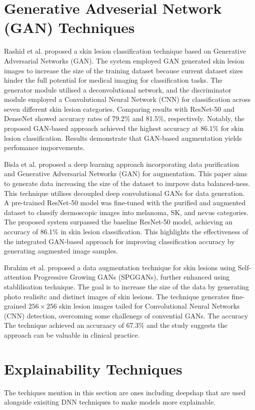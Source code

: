 \section{Generative Adveserial Network (GAN) Techniques}
Rashid et al.\cite{Rashid2019b} proposed a skin lesion classification technique based on Generative Adversarial Networks (GAN). The system employed GAN generated skin lesion images to increase the size of the training dataset because current dataset sizes hinder the full potential for medical imaging for classification tasks. The generator module utilised a deconvolutional network, and the discriminator module employed a Convolutional Neural Network (CNN) for classification across seven different skin lesion categories. Comparing results with ResNet-50 and DenseNet showed accuracy rates of 79.2\% and 81.5\%, respectively. Notably, the proposed GAN-based approach achieved the highest accuracy at 86.1\% for skin lesion classification. Results demonstrate that GAN-based augmentation yields perfomance imporvements.

Bisla et al.\cite{Bisla2019} proposed a deep learning approach incorporating data purification and Generative Adversarial Networks (GAN) for augmentation. This paper aims to generate data increasing the size of the dataset to imrpove data balanced-ness. This technique utilises decoupled deep convolutional GANs for data generation. A pre-trained ResNet-50 model was fine-tuned with the purified and augmented dataset to classify dermoscopic images into melanoma, SK, and nevus categories. The proposed system surpassed the baseline ResNet-50 model, achieving an accuracy of 86.1\% in skin lesion classification. This highlights the effectiveness of the integrated GAN-based approach for improving classification accuracy by generating augmented image samples.

Ibrahim et al.\cite{Abdelhalim2021} proposed a data augmentation technique for skin lesions using Self-attention Progressive Growing GANs (SPGGANs), further enhanced using stablilisation technique. The goal is to increase the size of the data by generating photo realisitc and distinct images of skin lesions. The technique generates fine-grained $256\times256$ skin lesion images tailed for Convolutional Neural Networks (CNN) detection, overcoming some challenegs of convential GANs. The accuracy The technique achieved an accuraacy of 67.3\% and the study suggests the approach can be valuable in clinical practice.

\section{Explainability Techniques}
The techiques mention in this section are ones including deepshap that are used alongside exisiting DNN techniques to make models more explainable.

